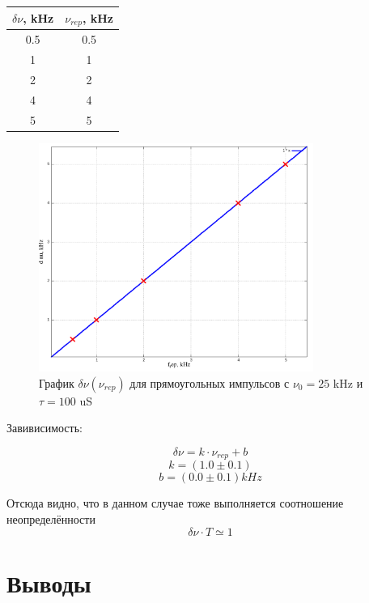 \documentclass{article}
\begin{document}
\begin{table}[H]
    \centering
    \begin{tabular}{|c|c|}
        \hline
        \(\delta\nu\), kHz & \(\nu_{rep}\), kHz\\\hline
        0.5 & 0.5 \\\hline
        1   & 1   \\\hline
        2   & 2   \\\hline
        4   & 4   \\\hline
        5   & 5   \\\hline
    \end{tabular}
\end{table}

\begin{figure}[H]
    \centering
    \includegraphics[width=0.8\textwidth]{dnu_frep.png}
    \caption{График \( \delta\nu(\nu_{rep}) \) для прямоугольных импульсов с \( \nu_0 = 25\) kHz и \(\tau = 100\) uS}
    \label{pic_dnu_tau}
\end{figure}

Завивисимость:

\[ \delta\nu = k\cdot\nu_{rep} + b \]
\[ k = (1.0 \pm 0.1) \]
\[ b = (0.0 \pm 0.1) kHz\]

Отсюда видно, что в данном случае тоже выполняется соотношение неопределённости
\[ \delta\nu\cdot T \simeq 1 \]





\section{Выводы}
\end{document}
